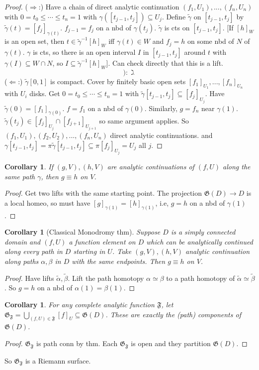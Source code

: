 \documentclass{article}
\theoremstyle{definition}
\theoremstyle{remark}
\theoremstyle{plain}
\newtheorem{crly}[defn]{Corollary}
\begin{document}
\begin{proof}
    ($\Rightarrow$:)%
    Have a chain of direct analytic continuation $(f_1,U_1),...,(f_n,U_n)$ with $0= t_0\le \cdots \le t_n=1$ with $\gamma([t_{j-1},t_j])\subseteq U_j$. Define $\tilde\gamma$ on $[t_{j-1},t_j]$ by $\tilde\gamma(t)=[f_j]_{\gamma(t)}$. $f_{j-1}=f_j$ on a nbd of $\gamma(t_j)$. $\tilde \gamma $ is  cts on $[t_{j-1},t_j]$. [If $[h]_W$ is an open set, then $t\in \tilde\gamma^{-1}[h]_W$ iff $\gamma(t)\in W$ and $f_j=h$ on some nbd of $N$ of $\gamma(t)$. $\gamma$ is cts, so there is an open interval $I$ in $[t_{j-1},t_j]$ around $t$ with $\gamma(I)\subseteq W\cap N$, so $I\subseteq \tilde\gamma^{-1}[h]_W$]. Can check directly that this is a lift.
\[):\gimel\tag{Owen's Signature}\]
    ($\Leftarrow$:) $\tilde\gamma[0,1]$ is compact. Cover by finitely basic open sets $[f_1]_{U_1},...,[f_n]_{U_n}$ with $U_i$ disks. Get $0=t_0\le \cdots\le t_n=1$ with $\tilde \gamma[t_{j-1},t_j]\subseteq[f_j]_{U_j}$. Have $\tilde\gamma(0)=[f_1]_{\gamma(0)}$. $f=f_1$ on a nbd of $\gamma(0)$. Similarly, $g=f_n$ near $\gamma(1)$. $\tilde\gamma(t_j)\in[f_j]_{U_j}\cap[f_{j+1}]_{U_{j+1}}$ so same argument applies. So $(f_1,U_1), (f_2,U_2),...,(f_n,U_n)$ direct analytic continuations. and $\gamma[t_{j-1},t_j]=\pi\tilde\gamma[t_{j-1},t_j]\subseteq\pi[f_j]_{U_j}=U_j$ all $j$.
\end{proof}
\begin{crly}
    If $(g,V),(h,V)$ are analytic continuations of $(f,U)$ along the same path $\gamma$, then $g\equiv h$ on $V$.
\end{crly}
\begin{proof}
    Get two lifts with the same starting point. The projection $\mathfrak G(D)\to D$ is a local homeo, so must have $[g]_{\gamma(1)}=[h]_{\gamma(1)}$, i.e, $g=h$ on a nbd of $\gamma(1)$.
\end{proof}
\begin{crly}[Classical Monodromy thm]
    Suppose $D$ is a simply connected domain and $(f,U)$ a function element on $D$ which can be analytically continued along every path in $D$ starting in $U$. Take $(g,V), (h,V)$ analytic continuation along paths $\alpha,\beta$ in $D$ with the same endpoints. Then $g\equiv h$ on $V$.
\end{crly}
\begin{proof}
    Have lifts $\tilde\alpha,\tilde\beta$. Lift the path homotopy $\alpha\simeq\beta$ to a path homotopy of $\tilde\alpha\simeq\tilde\beta$. So $g=h$ on a nbd of $\alpha(1)=\beta(1)$.
\end{proof}
\begin{crly}
    For any complete analytic function $\mathfrak F$, let $\mathfrak G_{\mathfrak F}=\bigcup_{(f,U)\in\mathfrak F}[f]_U\subseteq\mathfrak G(D)$. These are exactly the (path) components of $\mathfrak G(D)$.
\end{crly}
\begin{proof}
    $\mathfrak G_{\mathfrak F}$ is path conn by thm. Each $\mathfrak G_{\mathfrak F}$ is open and they partition $\mathfrak G(D)$.
\end{proof}
So $\mathfrak G_{\mathfrak F}$ is a Riemann surface.
\end{document}
